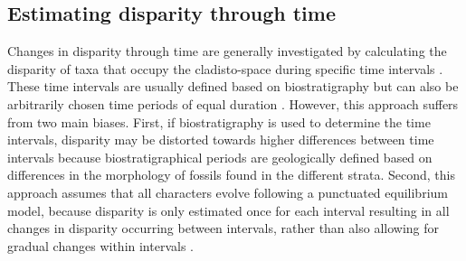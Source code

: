 \documentclass[10pt,letterpaper]{article}
\begin{document}
\subsection{Estimating disparity through time} 
Changes in disparity through time are generally investigated by calculating the disparity of taxa that occupy the cladisto-space during specific time intervals \citep[e.g][]{cisneros2010,prentice2011,Hughes20082013,hopkinsdecoupling2013,bentonmodels2014,bensonfaunal2014}.
These time intervals are usually defined based on biostratigraphy \citep[e.g.][]{cisneros2010,prentice2011,Hughes20082013,bentonmodels2014} but can also be arbitrarily chosen time periods of equal duration \citep{Butler2012,hopkinsdecoupling2013,bensonfaunal2014}.
However, this approach suffers from two main biases. 
First, if biostratigraphy is used to determine the time intervals, disparity may be distorted towards higher differences between time intervals because biostratigraphical periods are geologically defined based on differences in the morphology of fossils found in the different strata.
Second, this approach assumes that all characters evolve following a punctuated equilibrium model, because disparity is only estimated once for each interval resulting in all changes in disparity occurring between intervals, rather than also allowing for gradual changes within intervals \citep{Hunt21042015}.
\end{document}
